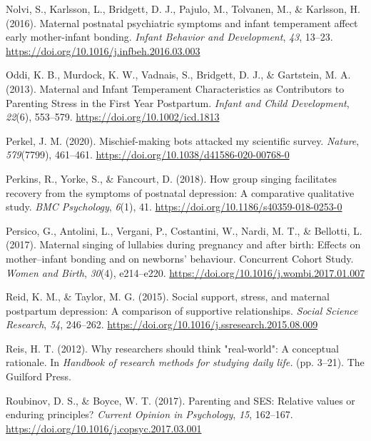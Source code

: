 \documentclass[
]{article}
\newlength{\cslhangindent}
\newenvironment{CSLReferences}[2] %
 {\begin{list}{}{%
  \setlength{\itemindent}{0pt}
  \setlength{\leftmargin}{0pt}
  \setlength{\parsep}{0pt}
  \ifodd #1
   \setlength{\leftmargin}{\cslhangindent}
   \setlength{\itemindent}{-1\cslhangindent}
  \fi
  \setlength{\itemsep}{#2\baselineskip}}}
 {\end{list}}
\begin{document}
\begin{CSLReferences}{1}{0}
Nolvi, S., Karlsson, L., Bridgett, D. J., Pajulo, M., Tolvanen, M., \&
Karlsson, H. (2016). Maternal postnatal psychiatric symptoms and infant
temperament affect early mother-infant bonding. \emph{Infant Behavior
and Development}, \emph{43}, 13--23.
\url{https://doi.org/10.1016/j.infbeh.2016.03.003}

Oddi, K. B., Murdock, K. W., Vadnais, S., Bridgett, D. J., \& Gartstein,
M. A. (2013). Maternal and {Infant Temperament Characteristics} as
{Contributors} to {Parenting Stress} in the {First Year Postpartum}.
\emph{Infant and Child Development}, \emph{22}(6), 553--579.
\url{https://doi.org/10.1002/icd.1813}

Perkel, J. M. (2020). Mischief-making bots attacked my scientific
survey. \emph{Nature}, \emph{579}(7799), 461--461.
\url{https://doi.org/10.1038/d41586-020-00768-0}

Perkins, R., Yorke, S., \& Fancourt, D. (2018). How group singing
facilitates recovery from the symptoms of postnatal depression: A
comparative qualitative study. \emph{BMC Psychology}, \emph{6}(1), 41.
\url{https://doi.org/10.1186/s40359-018-0253-0}

Persico, G., Antolini, L., Vergani, P., Costantini, W., Nardi, M. T., \&
Bellotti, L. (2017). Maternal singing of lullabies during pregnancy and
after birth: {Effects} on mother--infant bonding and on newborns'
behaviour. {Concurrent Cohort Study}. \emph{Women and Birth},
\emph{30}(4), e214--e220.
\url{https://doi.org/10.1016/j.wombi.2017.01.007}

Reid, K. M., \& Taylor, M. G. (2015). Social support, stress, and
maternal postpartum depression: {A} comparison of supportive
relationships. \emph{Social Science Research}, \emph{54}, 246--262.
\url{https://doi.org/10.1016/j.ssresearch.2015.08.009}

Reis, H. T. (2012). Why researchers should think "real-world": {A}
conceptual rationale. In \emph{Handbook of research methods for studying
daily life.} (pp. 3--21). The Guilford Press.

Roubinov, D. S., \& Boyce, W. T. (2017). Parenting and {SES}: {Relative}
values or enduring principles? \emph{Current Opinion in Psychology},
\emph{15}, 162--167. \url{https://doi.org/10.1016/j.copsyc.2017.03.001}


\end{CSLReferences}
\end{document}
